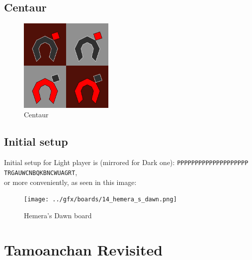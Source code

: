 \documentclass[a5paper,12pt,draft]{book} %
\begin{document}
\clearpage

\section*{Centaur}

\noindent
\begin{figure}
\includegraphics[width=0.4\textwidth, keepaspectratio=true]{../gfx/pieces/12_centaur.png}
\caption{Centaur}
\label{fig:centaur}
\end{figure}

\clearpage

\section*{Initial setup}

Initial setup for Light player is (mirrored for Dark one):
\texttt{PPPPPPPPPPPPPPPPPPPP \\
        TRGAUWCNBQKBNCWUAGRT}, \\
or more conveniently, as seen in this image:

\noindent
\begin{figure}[h]
\texttt{[image: ../gfx/boards/14\_hemera\_s\_dawn.png]}
\caption{Hemera's Dawn board}
\label{fig:hemera_s_dawn}
\end{figure}

\clearpage

\chapter*{Tamoanchan Revisited}
\end{document}

